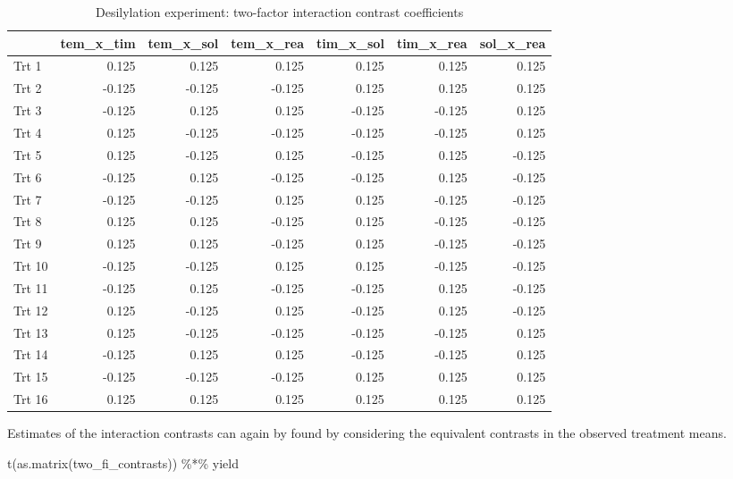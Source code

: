 \documentclass[
]{book}
\newenvironment{Shaded}{\begin{snugshade}}{\end{snugshade}}
\newcommand{\FunctionTok}[1]{\textcolor[rgb]{0.00,0.00,0.00}{#1}}
\newcommand{\NormalTok}[1]{#1}
\newcommand{\SpecialCharTok}[1]{\textcolor[rgb]{0.00,0.00,0.00}{#1}}
\theoremstyle{definition}
\theoremstyle{definition}
\theoremstyle{definition}
\theoremstyle{definition}
\theoremstyle{remark}
\begin{document}
\begin{table}

\caption{\label{tab:desilylation-2fi-interactions}Desilylation experiment: two-factor interaction contrast coefficients}
\centering
\begin{tabular}[t]{l|r|r|r|r|r|r}
\hline
  & tem\_x\_tim & tem\_x\_sol & tem\_x\_rea & tim\_x\_sol & tim\_x\_rea & sol\_x\_rea\\
\hline
Trt 1 & 0.125 & 0.125 & 0.125 & 0.125 & 0.125 & 0.125\\
\hline
Trt 2 & -0.125 & -0.125 & -0.125 & 0.125 & 0.125 & 0.125\\
\hline
Trt 3 & -0.125 & 0.125 & 0.125 & -0.125 & -0.125 & 0.125\\
\hline
Trt 4 & 0.125 & -0.125 & -0.125 & -0.125 & -0.125 & 0.125\\
\hline
Trt 5 & 0.125 & -0.125 & 0.125 & -0.125 & 0.125 & -0.125\\
\hline
Trt 6 & -0.125 & 0.125 & -0.125 & -0.125 & 0.125 & -0.125\\
\hline
Trt 7 & -0.125 & -0.125 & 0.125 & 0.125 & -0.125 & -0.125\\
\hline
Trt 8 & 0.125 & 0.125 & -0.125 & 0.125 & -0.125 & -0.125\\
\hline
Trt 9 & 0.125 & 0.125 & -0.125 & 0.125 & -0.125 & -0.125\\
\hline
Trt 10 & -0.125 & -0.125 & 0.125 & 0.125 & -0.125 & -0.125\\
\hline
Trt 11 & -0.125 & 0.125 & -0.125 & -0.125 & 0.125 & -0.125\\
\hline
Trt 12 & 0.125 & -0.125 & 0.125 & -0.125 & 0.125 & -0.125\\
\hline
Trt 13 & 0.125 & -0.125 & -0.125 & -0.125 & -0.125 & 0.125\\
\hline
Trt 14 & -0.125 & 0.125 & 0.125 & -0.125 & -0.125 & 0.125\\
\hline
Trt 15 & -0.125 & -0.125 & -0.125 & 0.125 & 0.125 & 0.125\\
\hline
Trt 16 & 0.125 & 0.125 & 0.125 & 0.125 & 0.125 & 0.125\\
\hline
\end{tabular}
\end{table}

Estimates of the interaction contrasts can again by found by considering the equivalent contrasts in the observed treatment means.

\begin{Shaded}
\begin{Highlighting}[]
\FunctionTok{t}\NormalTok{(}\FunctionTok{as.matrix}\NormalTok{(two\_fi\_contrasts)) }\SpecialCharTok{\%*\%}\NormalTok{ yield}
\end{Highlighting}
\end{Shaded}
\end{document}

